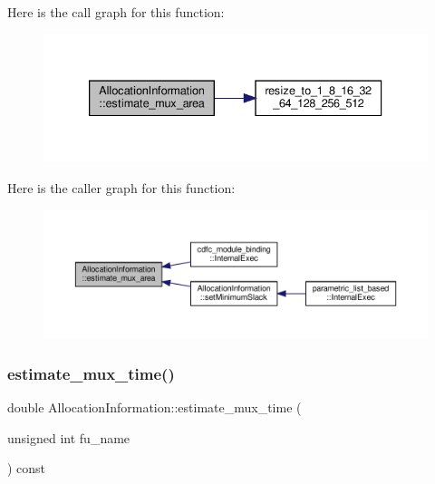 Here is the call graph for this function\+:
\nopagebreak
\begin{figure}[H]
\begin{center}
\leavevmode
\includegraphics[width=333pt]{d7/d79/classAllocationInformation_a2b709f9c79ac9504bd36620dd385ce50_cgraph}
\end{center}
\end{figure}
Here is the caller graph for this function\+:
\nopagebreak
\begin{figure}[H]
\begin{center}
\leavevmode
\includegraphics[width=350pt]{d7/d79/classAllocationInformation_a2b709f9c79ac9504bd36620dd385ce50_icgraph}
\end{center}
\end{figure}
\mbox{\label{classAllocationInformation_aa0a32dbda0f86f889ed915dfdd3f5686}} 
\subsubsection{\texorpdfstring{estimate\+\_\+mux\+\_\+time()}{estimate\_mux\_time()}}
{\footnotesize\ttfamily double Allocation\+Information\+::estimate\+\_\+mux\+\_\+time (\begin{DoxyParamCaption}\item[{unsigned int}]{fu\+\_\+name }\end{DoxyParamCaption}) const}



